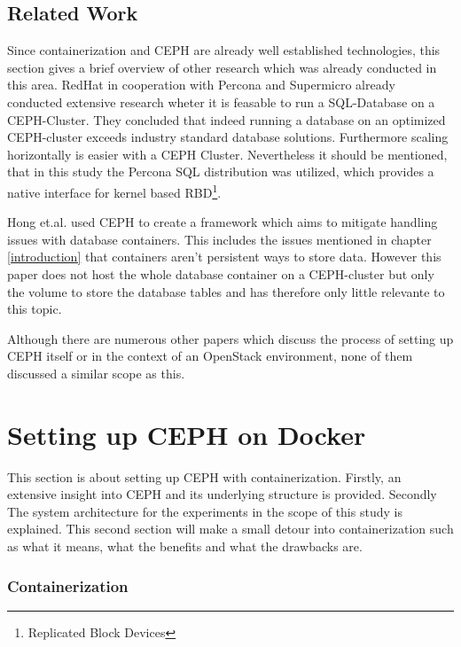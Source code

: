 \documentclass[titlepage, a4paper, 11pt]{scrartcl}
\begin{document}
        \subsection{Related Work}
        
            Since containerization and CEPH are already well established technologies, this section gives a brief overview of 
            other research which was already conducted in this area.
            RedHat in cooperation with Percona and Supermicro already conducted extensive research wheter it is feasable to
            run a SQL-Database on a CEPH-Cluster\cite{redhatstudy}. They concluded that indeed running a database on an 
            optimized CEPH-cluster exceeds industry standard database solutions. Furthermore scaling horizontally 
            is easier with a CEPH Cluster. Nevertheless it should be mentioned, that in this study the Percona 
            SQL distribution was utilized, which provides a native interface for kernel based RBD\footnote{Replicated Block Devices}.
            
            Hong et.al. used CEPH to create a framework which aims to mitigate handling issues with database containers.
            This includes the issues mentioned in chapter \ref*{introduction} that containers aren't persistent ways
            to store data\cite{hong2019database}. However this paper does not host the whole database container on a CEPH-cluster but only the volume to store the database tables and has therefore only little relevante to this topic.
            
            Although there are numerous other papers
            which discuss the process of setting up CEPH itself or in the context of an OpenStack environment,
            none of them discussed a similar scope as this.            

    \section{Setting up CEPH on Docker}

        This section is about setting up CEPH with containerization. Firstly, an extensive insight into CEPH and its underlying
        structure is provided. Secondly The system architecture for the experiments in the scope of this study is explained.
        This second section will make a small detour into containerization such as what it means, what the benefits and what the drawbacks are.

        \subsubsection{Containerization}\label{system:containerization}
\end{document}
